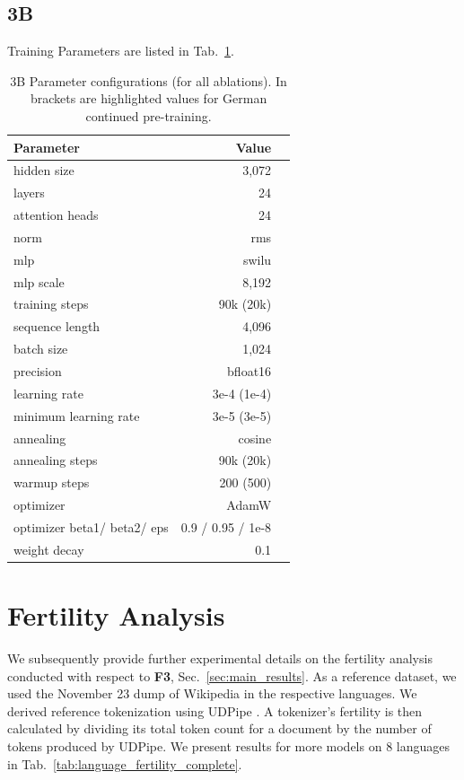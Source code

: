 \documentclass[11pt]{article}
\begin{document}
\subsection{3B}
Training Parameters are listed in Tab.~\ref{tab:3b_parameters}.

\begin{table}[]
    \centering
\begin{tabular}{lrr}
\toprule
         Parameter & Value \\
\midrule
hidden size & 3,072 \\
layers &  24 \\
attention heads & 24 \\
norm & rms \\
mlp & swilu \\
mlp scale & 8,192 \\
training steps & 90k (20k) \\
sequence length & 4,096 \\
batch size & 1,024 \\
\midrule
precision & bfloat16 \\
learning rate &  3e-4 (1e-4) \\
minimum learning rate & 3e-5 (3e-5)\\
annealing & cosine \\
annealing steps & 90k (20k) \\
warmup steps & 200 (500) \\
optimizer & AdamW \\
optimizer beta1/ beta2/ eps & 0.9 / 0.95 / 1e-8 \\
weight decay & 0.1 \\
\bottomrule
    \end{tabular}
    \caption{3B Parameter configurations (for all ablations). In brackets are highlighted values for German continued pre-training.}
    \label{tab:3b_parameters}
\end{table}


\section{Fertility Analysis}
\label{app:fertility}
We subsequently provide further experimental details on the fertility analysis conducted with respect to \textbf{F3}, Sec.~\ref{sec:main_results}. 
As a reference dataset, we used the November 23 dump of Wikipedia in the respective languages. We derived reference tokenization using UDPipe \cite{straka-2018-udpipe}. A tokenizer's fertility is then calculated by dividing its total token count for a document by the number of tokens produced by UDPipe.
We present results for more models on 8 languages in Tab.~\ref{tab:language_fertility_complete}.
\end{document}
